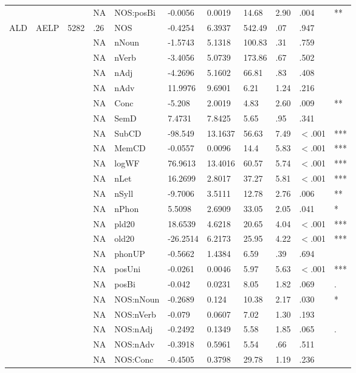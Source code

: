\begin{table}[ht]
\begin{tabular}{lllllllllll}
   &  &  & NA & NOS:posBi & -0.0056 & 0.0019 & 14.68 & 2.90 & .004 & ** \\ 
  ALD & AELP & 5282 & .26 & NOS & -0.4254 & 6.3937 & 542.49 & .07 & .947 &   \\ 
   &  &  & NA & nNoun & -1.5743 & 5.1318 & 100.83 & .31 & .759 &   \\ 
   &  &  & NA & nVerb & -3.4056 & 5.0739 & 173.86 & .67 & .502 &   \\ 
   &  &  & NA & nAdj & -4.2696 & 5.1602 & 66.81 & .83 & .408 &   \\ 
   &  &  & NA & nAdv & 11.9976 & 9.6901 & 6.21 & 1.24 & .216 &   \\ 
   &  &  & NA & Conc & -5.208 & 2.0019 & 4.83 & 2.60 & .009 & ** \\ 
   &  &  & NA & SemD & 7.4731 & 7.8425 & 5.65 & .95 & .341 &   \\ 
   &  &  & NA & SubCD & -98.549 & 13.1637 & 56.63 & 7.49 & $<$.001 & *** \\ 
   &  &  & NA & MemCD & -0.0557 & 0.0096 & 14.4 & 5.83 & $<$.001 & *** \\ 
   &  &  & NA & logWF & 76.9613 & 13.4016 & 60.57 & 5.74 & $<$.001 & *** \\ 
   &  &  & NA & nLet & 16.2699 & 2.8017 & 37.27 & 5.81 & $<$.001 & *** \\ 
   &  &  & NA & nSyll & -9.7006 & 3.5111 & 12.78 & 2.76 & .006 & ** \\ 
   &  &  & NA & nPhon & 5.5098 & 2.6909 & 33.05 & 2.05 & .041 & * \\ 
   &  &  & NA & pld20 & 18.6539 & 4.6218 & 20.65 & 4.04 & $<$.001 & *** \\ 
   &  &  & NA & old20 & -26.2514 & 6.2173 & 25.95 & 4.22 & $<$.001 & *** \\ 
   &  &  & NA & phonUP & -0.5662 & 1.4384 & 6.59 & .39 & .694 &   \\ 
   &  &  & NA & posUni & -0.0261 & 0.0046 & 5.97 & 5.63 & $<$.001 & *** \\ 
   &  &  & NA & posBi & -0.042 & 0.0231 & 8.05 & 1.82 & .069 & . \\ 
   &  &  & NA & NOS:nNoun & -0.2689 & 0.124 & 10.38 & 2.17 & .030 & * \\ 
   &  &  & NA & NOS:nVerb & -0.079 & 0.0607 & 7.02 & 1.30 & .193 &   \\ 
   &  &  & NA & NOS:nAdj & -0.2492 & 0.1349 & 5.58 & 1.85 & .065 & . \\ 
   &  &  & NA & NOS:nAdv & -0.3918 & 0.5961 & 5.54 & .66 & .511 &   \\ 
   &  &  & NA & NOS:Conc & -0.4505 & 0.3798 & 29.78 & 1.19 & .236 &   \\ 

\end{tabular}
\end{table}
